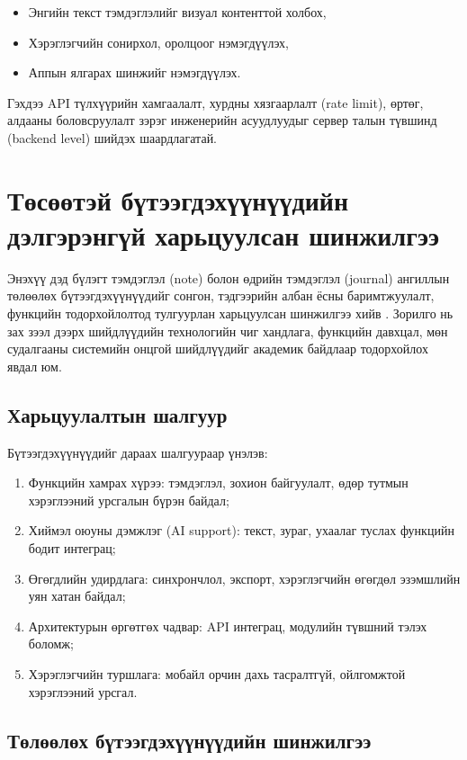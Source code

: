 \begin{itemize}
    \item Энгийн текст тэмдэглэлийг визуал контенттой холбох,
    \item Хэрэглэгчийн сонирхол, оролцоог нэмэгдүүлэх,
    \item Аппын ялгарах шинжийг нэмэгдүүлэх.
\end{itemize}

Гэхдээ API түлхүүрийн хамгаалалт, хурдны хязгаарлалт (rate limit), өртөг, алдааны боловсруулалт зэрэг инженерийн асуудлуудыг сервер талын түвшинд (backend level) шийдэх шаардлагатай.

\section{Төсөөтэй бүтээгдэхүүнүүдийн дэлгэрэнгүй харьцуулсан шинжилгээ}

Энэхүү дэд бүлэгт тэмдэглэл (note) болон өдрийн тэмдэглэл (journal) ангиллын төлөөлөх бүтээгдэхүүнүүдийг сонгон, тэдгээрийн албан ёсны баримтжуулалт, функцийн тодорхойлолтод тулгуурлан харьцуулсан шинжилгээ хийв \cite{evernote_help}\cite{notion_help}\cite{onenote_docs}\cite{journey_docs}. Зорилго нь зах зээл дээрх шийдлүүдийн технологийн чиг хандлага, функцийн давхцал, мөн судалгааны системийн онцгой шийдлүүдийг академик байдлаар тодорхойлох явдал юм.

\subsection{Харьцуулалтын шалгуур}

Бүтээгдэхүүнүүдийг дараах шалгуураар үнэлэв:

\begin{enumerate}
    \item Функцийн хамрах хүрээ: тэмдэглэл, зохион байгуулалт, өдөр тутмын хэрэглээний урсгалын бүрэн байдал;
    \item Хиймэл оюуны дэмжлэг (AI support): текст, зураг, ухаалаг туслах функцийн бодит интеграц;
    \item Өгөгдлийн удирдлага: синхрончлол, экспорт, хэрэглэгчийн өгөгдөл эзэмшлийн уян хатан байдал;
    \item Архитектурын өргөтгөх чадвар: API интеграц, модулийн түвшний тэлэх боломж;
    \item Хэрэглэгчийн туршлага: мобайл орчин дахь тасралтгүй, ойлгомжтой хэрэглээний урсгал.
\end{enumerate}

\subsection{Төлөөлөх бүтээгдэхүүнүүдийн шинжилгээ}

